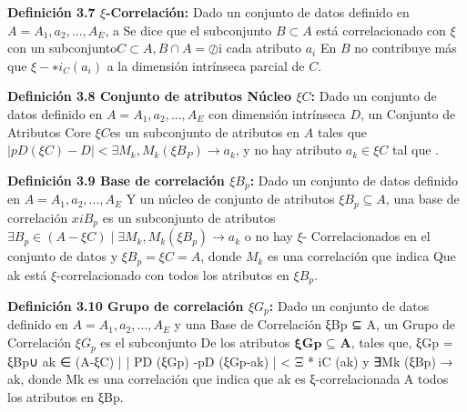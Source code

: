 \textbf{Definición 3.7 $\xi$-Correlación:} Dado un conjunto de datos definido en $A = {A_1, a_2,. . . , A_E}$, a
Se dice que el subconjunto $B\subset A$ está correlacionado con $\xi$ con un subconjunto$C\subset A,B\cap A= \oslash$i cada atributo $a_i$
En $B$ no contribuye más que  $ \xi- ∗ i_C(a_i)$  a la dimensión intrínseca parcial de $C$.

\textbf{Definición 3.8 Conjunto de atributos Núcleo $\xi C$:} Dado un conjunto de datos definido en $A = {A_1, a_2,. . . , A_E}$ con dimensión intrínseca $D$, un Conjunto de Atributos Core $\xi C$es un subconjunto de atributos en $ A$ tales que$\mid pD (\xi C) -D\mid <\exists M_k,M_k(\xi B_P)\rightarrow a_k$, y no hay atributo $ a_k \in \xi C$ tal que $ $.


\textbf{Definición 3.9 Base de correlación $\xi B_p$: }Dado un conjunto de datos  definido en $A = {A_1, a_2,. . . , A_E}$
Y un núcleo de conjunto de atributos $ \xi B_p \subseteq A $, una base de correlación $ xi B_p $ es un subconjunto de atributos $\exists B_p \in (A- \xi C)\mid \exists M_k, M_k(\xi B_p)\rightarrow a_k$ o no hay $\xi$-
Correlacionados en el conjunto de datos y $\xi B_p = \xi C = A$, donde $M_k$ es una correlación que indica
Que ak está $\xi$-correlacionado con todos los atributos en $\xi B_p$.


\textbf{Definición 3.10 Grupo de correlación $\xi  G_p$:} Dado un conjunto de datos definido en $A = {A_1, a_2,. . . , A_E}$ y una Base de Correlación ξBp ⊆ A, un Grupo de Correlación $\xi  G_p$ es el subconjunto
De los atributos $\textbf{ξGp ⊆ A}$, tales que, ξGp = ξBp∪ ak ∈ (A-ξC) | | PD (ξGp) -pD (ξGp-ak) | <
Ξ * iC ({ak}) y ∃Mk (ξBp) → ak, donde Mk es una correlación que indica que ak es ξ-correlacionada
A todos los atributos en ξBp.




